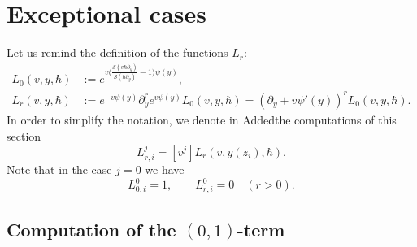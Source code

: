 \documentclass[JEP,XML,SOM,Unicode,NoEqCountersInSection,NoFloatCountersInSection]{cedram}
\let\mathcal\mathscr
\theoremstyle{plain}
\theoremstyle{definition}
\theoremstyle{remark}
\newcommand{\cS}{\mathcal{S}}
\begin{document}
\section{Exceptional cases}\label{sec:exceptions}

Let us remind the definition of the functions $L_r$:
\begin{align*}
L_0(v,y,\hbar)&:=e^{v\bigl(\frac{\cS(v\hbar\partial_y)}{\cS(\hbar\partial_y)}-1\bigr)\psi(y)},\\
L_r(v,y,\hbar)&:=e^{-v\psi(y)}\partial_y^re^{v\psi(y)}L_0(v,y,\hbar)
=\left(\partial_y+v\psi'(y)\right)^rL_0(v,y,\hbar).
\end{align*}
In order to simplify the notation, we denote in Added{the} computations of this section
\begin{equation*}
L_{r,i}^j=[v^j]L_r(v,y(z_i),\hbar).
\end{equation*}
Note that in the case $j=0$ we have
\begin{equation*}
L_{0,i}^0=1,\qquad L_{r,i}^0=0\quad (r>0).
\end{equation*}

\subsection{Computation of the \texorpdfstring{$(0,1)$}{(0,1)}-term}
\end{document}
